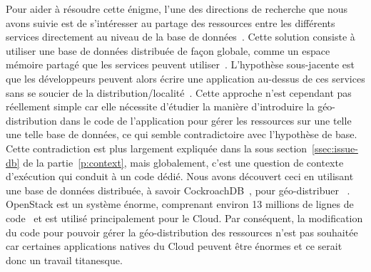 

Pour aider à résoudre cette énigme, l'une des directions de recherche
que nous avons suivie est de s'intéresser au partage des ressources
entre les différents services directement au niveau de la base de
données~\cite{LPSD17, VSK18, RLA19}.
%
Cette solution consiste à utiliser une base de données distribuée de
façon globale, comme un espace mémoire partagé que les services
peuvent utiliser~\cite{CDEF+12}.
%
L'hypothèse sous-jacente est que les développeurs peuvent alors écrire
une application au-dessus de ces services sans se soucier de la
distribution/localité~\cite{SBPB+18,SS19}.
%
Cette approche n'est cependant pas réellement simple car elle
nécessite d'étudier la manière d'introduire la géo-distribution dans
le code de l'application pour gérer les ressources sur une telle une
telle base de données, ce qui semble contradictoire avec l'hypothèse
de base.
%
Cette contradiction est plus largement expliquée dans la sous
section~\ref{ssec:issue-db} de la partie~\ref{p:context}, mais
globalement, c'est une question de contexte d'exécution qui conduit à
un code dédié.
%
Nous avons découvert ceci en utilisant une base de données distribuée,
à savoir CockroachDB~\cite{cockroachdb}, pour géo-distribuer
\os~\cite{Che17,DCL18}.
%
OpenStack est un système énorme, comprenant environ 13 millions de
lignes de code~\cite{openstackloc} et est utilisé principalement
pour le Cloud.
%
Par conséquent, la modification du code pour pouvoir gérer la
géo-distribution des ressources n'est pas souhaitée car certaines
applications natives du Cloud peuvent être énormes et ce serait donc
un travail titanesque.


